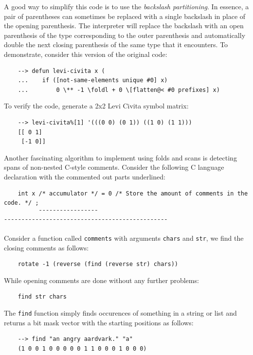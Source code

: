 A good way to simplify this code is to use the \textit{backslash partitioning}. In essence, a pair of parentheses can sometimes be replaced with a single backslash in place of the opening parenthesis. The interpreter will replace the backslash with an open parenthesis of the type corresponding to the outer parenthesis and automatically double the next closing parenthesis of the same type that it encounters. To demonstrate, consider this version of the original code:

\begin{Verbatim}
    --> defun levi-civita x (
    ...    if ([not-same-elements unique #0] x)
    ...        0 \** -1 \foldl + 0 \[flatten@< #0 prefixes] x)
\end{Verbatim}

To verify the code, generate a 2x2 Levi Civita symbol matrix:

\begin{Verbatim}
    --> levi-civita%[1] '(((0 0) (0 1)) ((1 0) (1 1)))
    [[ 0 1]
     [-1 0]]
\end{Verbatim}

Another fascinating algorithm to implement using folds and scans is detecting spans of non-nested C-style comments. Consider the following C language declaration with the commented out parts underlined:

\begin{Verbatim}
    int x /* accumulator */ = 0 /* Store the amount of comments in the code. */ ;
          ¯¯¯¯¯¯¯¯¯¯¯¯¯¯¯¯¯     ¯¯¯¯¯¯¯¯¯¯¯¯¯¯¯¯¯¯¯¯¯¯¯¯¯¯¯¯¯¯¯¯¯¯¯¯¯¯¯¯¯¯¯¯¯¯¯
\end{Verbatim}

Consider a function called \verb|comments| with arguments \verb|chars| and \verb|str|, we find the closing comments as follows:

\begin{Verbatim}
    rotate -1 (reverse (find (reverse str) chars))
\end{Verbatim}

While opening comments are done without any further problems:

\begin{Verbatim}
    find str chars
\end{Verbatim}

The \verb|find| function simply finds occurences of something in a string or list and returns a bit mask vector with the starting positions as follows:

\begin{Verbatim}
    --> find "an angry aardvark." "a"
    (1 0 0 1 0 0 0 0 0 1 1 0 0 0 1 0 0 0)
\end{Verbatim}

